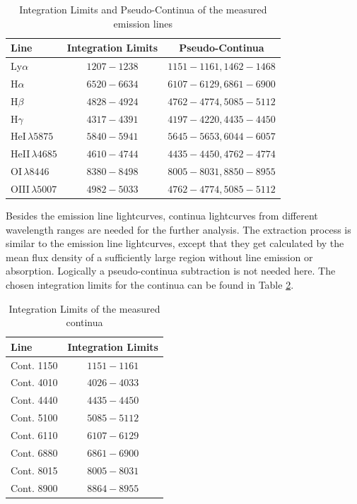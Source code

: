 \begin{table}[h!]
	\centering
	\small
	\caption{Integration Limits and Pseudo-Continua of the measured emission lines}
	\label{tab:emission_lines}
	\begin{tabular}{lcc}
		\hline
		\hline
		\textbf{Line} & \textbf{Integration Limits} & \textbf{Pseudo-Continua}  \\
		\hline
		Ly$\alpha$ & $1207-1238$ & $1151-1161, 1462-1468$\\
		\hline
		H$\alpha$ & $6520-6634$ & $6107-6129, 6861-6900$ \\
		H$\beta$ & $4828-4924$ & $4762-4774, 5085-5112$ \\
		H$\gamma$ & $4317-4391$ & $4197-4220, 4435-4450$ \\
		
		HeI$\,\lambda5875$ & $5840-5941$ & $5645-5653, 6044-6057$ \\
		HeII$\,\lambda4685$ & $4610-4744$ & $4435-4450, 4762-4774$ \\
		OI$\,\lambda 8446$ & $8380-8498$ & $8005-8031, 8850-8955$ \\
		\hline
		OIII$\,\lambda 5007$ & $4982-5033$ & $4762-4774, 5085-5112$ \\
		\hline
		\hline
	\end{tabular}
\end{table}


Besides the emission line lightcurves, continua lightcurves from different wavelength ranges are needed for the further analysis. The extraction process is similar to the emission line lightcurves, except that they get calculated by the mean flux density of a sufficiently large region without line emission or absorption. Logically a pseudo-continua subtraction is not needed here. The chosen integration limits for the continua can be found in Table \ref{tab:continua}.


\begin{table}[h!]
	\centering
	\small
	\caption{Integration Limits of the measured continua}
	\label{tab:continua}
	\begin{tabular}{lc}
		\hline
		\hline
		\textbf{Line} & \textbf{Integration Limits}  \\
		\hline
		Cont. 1150 & $1151-1161$\\
		\hline
		Cont. 4010 & $4026-4033$\\
		Cont. 4440 & $4435-4450$\\
		Cont. 5100 & $5085-5112$\\
		Cont. 6110 & $6107-6129$\\
		Cont. 6880 & $6861-6900$\\
		Cont. 8015 & $8005-8031$\\
		Cont. 8900 & $8864-8955$\\
		\hline
		\hline
	\end{tabular}
\end{table}
